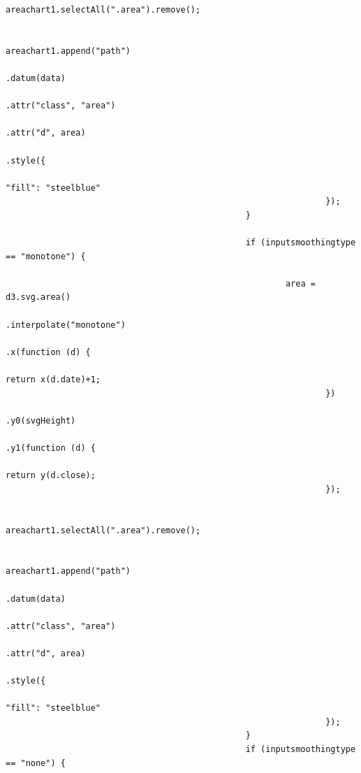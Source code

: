 \begin{lstlisting}[gobble=28]
                                                        areachart1.selectAll(".area").remove();

                                                        areachart1.append("path")
                                                                .datum(data)
                                                                .attr("class", "area")
                                                                .attr("d", area)
                                                                .style({
                                                                        "fill": "steelblue"
                                                                });
                                                }

                                                if (inputsmoothingtype == "monotone") {

                                                        area = d3.svg.area()
                                                                .interpolate("monotone")
                                                                .x(function (d) {
                                                                        return x(d.date)+1;
                                                                })
                                                                .y0(svgHeight)
                                                                .y1(function (d) {
                                                                        return y(d.close);
                                                                });

                                                        areachart1.selectAll(".area").remove();

                                                        areachart1.append("path")
                                                                .datum(data)
                                                                .attr("class", "area")
                                                                .attr("d", area)
                                                                .style({
                                                                        "fill": "steelblue"
                                                                });
                                                }
                                                if (inputsmoothingtype == "none") {
													


\end{lstlisting}
